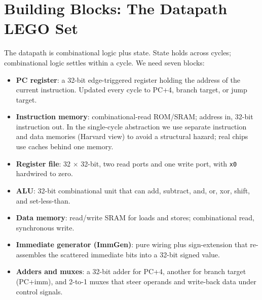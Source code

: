 \section{Building Blocks: The Datapath LEGO Set}
The datapath is combinational logic plus state. State holds across cycles; combinational logic settles within a cycle. We need seven blocks:
\begin{itemize}
\item \textbf{PC register}: a 32-bit edge-triggered register holding the address of the current instruction. Updated every cycle to PC+4, branch target, or jump target.
\item \textbf{Instruction memory}: combinational-read ROM/SRAM; address in, 32-bit instruction out. In the single-cycle abstraction we use separate instruction and data memories (Harvard view) to avoid a structural hazard; real chips use caches behind one memory.
\item \textbf{Register file}: 32 $\times$ 32-bit, two read ports and one write port, with \texttt{x0} hardwired to zero.
\item \textbf{ALU}: 32-bit combinational unit that can add, subtract, and, or, xor, shift, and set-less-than.
\item \textbf{Data memory}: read/write SRAM for loads and stores; combinational read, synchronous write.
\item \textbf{Immediate generator (ImmGen)}: pure wiring plus sign-extension that re-assembles the scattered immediate bits into a 32-bit signed value.
\item \textbf{Adders and muxes}: a 32-bit adder for PC+4, another for branch target (PC+imm), and 2-to-1 muxes that steer operands and write-back data under control signals.
\end{itemize}

